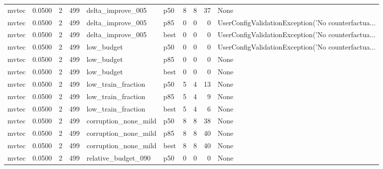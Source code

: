 \begin{tabular}{lrrrllrrrl}
   mvtec &    0.0500 &    2 &    499 &    delta\_improve\_005 &    p50 &               8 &          8 &      37 &                                               None \\
   mvtec &    0.0500 &    2 &    499 &    delta\_improve\_005 &    p85 &               0 &          0 &       0 & UserConfigValidationException('No counterfactua... \\
   mvtec &    0.0500 &    2 &    499 &    delta\_improve\_005 &   best &               0 &          0 &       0 & UserConfigValidationException('No counterfactua... \\
   mvtec &    0.0500 &    2 &    499 &           low\_budget &    p50 &               0 &          0 &       0 & UserConfigValidationException('No counterfactua... \\
   mvtec &    0.0500 &    2 &    499 &           low\_budget &    p85 &               0 &          0 &       0 &                                               None \\
   mvtec &    0.0500 &    2 &    499 &           low\_budget &   best &               0 &          0 &       0 &                                               None \\
   mvtec &    0.0500 &    2 &    499 &   low\_train\_fraction &    p50 &               5 &          4 &      13 &                                               None \\
   mvtec &    0.0500 &    2 &    499 &   low\_train\_fraction &    p85 &               5 &          4 &       9 &                                               None \\
   mvtec &    0.0500 &    2 &    499 &   low\_train\_fraction &   best &               5 &          4 &       6 &                                               None \\
   mvtec &    0.0500 &    2 &    499 & corruption\_none\_mild &    p50 &               8 &          8 &      38 &                                               None \\
   mvtec &    0.0500 &    2 &    499 & corruption\_none\_mild &    p85 &               8 &          8 &      40 &                                               None \\
   mvtec &    0.0500 &    2 &    499 & corruption\_none\_mild &   best &               8 &          8 &      40 &                                               None \\
   mvtec &    0.0500 &    2 &    499 &  relative\_budget\_090 &    p50 &               0 &          0 &       0 &                                               None \\

\end{tabular}
